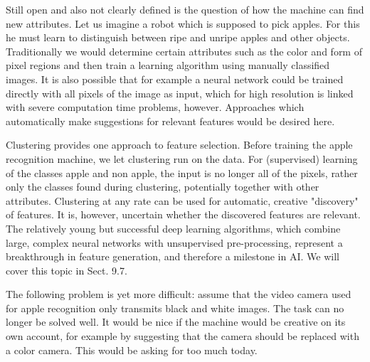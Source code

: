 \documentclass[10pt]{book}
\begin{document}
Still open and also not clearly defined is the question of how the machine can find new attributes. Let us imagine a robot which is supposed to pick apples. For this he must learn to distinguish between ripe and unripe apples and other objects. Traditionally we would determine certain attributes such as the color and form of pixel regions and then train a learning algorithm using manually classified images. It is also possible that for example a neural network could be trained directly with all pixels of the image as input, which for high resolution is linked with severe computation time problems, however. Approaches which automatically make suggestions for relevant features would be desired here.


Clustering provides one approach to feature selection. Before training the apple recognition machine, we let clustering run on the data. For (supervised) learning of the classes apple and non apple, the input is no longer all of the pixels, rather only the classes found during clustering, potentially together with other attributes. Clustering at any rate can be used for automatic, creative "discovery" of features. It is, however, uncertain whether the discovered features are relevant. The relatively young but successful deep learning algorithms, which combine large, complex neural networks with unsupervised pre-processing, represent a breakthrough in feature generation, and therefore a milestone in AI. We will cover this topic in Sect. 9.7.

The following problem is yet more difficult: assume that the video camera used for apple recognition only transmits black and white images. The task can no longer be solved well. It would be nice if the machine would be creative on its own account, for example by suggesting that the camera should be replaced with a color camera. This would be asking for too much today.
\end{document}
